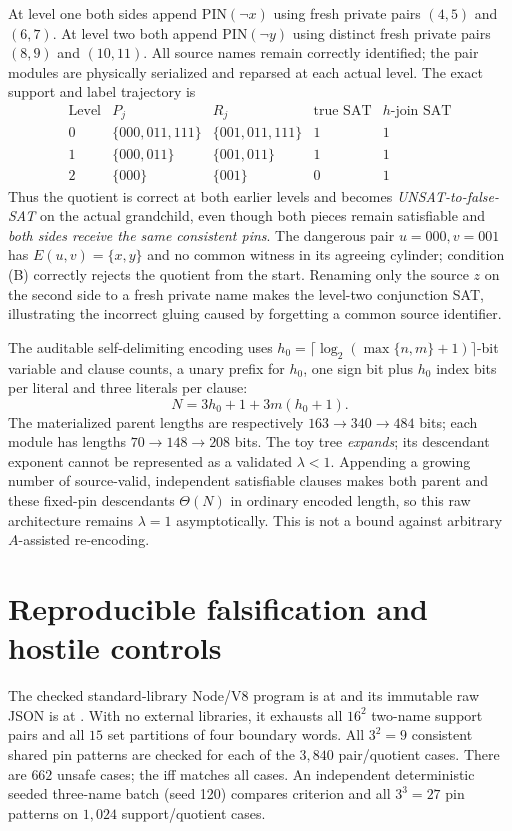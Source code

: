 \documentclass[11pt]{article}
\begin{document}
At level one both sides append $\mathrm{PIN}(\neg x)$ using
fresh private pairs $(4,5)$ and $(6,7)$.
At level two both append $\mathrm{PIN}(\neg y)$ using
distinct fresh private pairs $(8,9)$ and $(10,11)$.
All source names remain correctly identified; the pair modules
are physically serialized and reparsed at each actual level.
The exact support and label trajectory is
\[
\begin{array}{c|c|c|c|c}
 \text{Level}&P_j&R_j&\text{true SAT}&h\text{-join SAT}\\\hline
 0&\{000,011,111\}&\{001,011,111\}&1&1\\
 1&\{000,011\}&\{001,011\}&1&1\\
 2&\{000\}&\{001\}&0&1
\end{array}
\]
Thus the quotient is correct at both earlier levels and becomes
\emph{UNSAT-to-false-SAT} on the actual grandchild, even though
both pieces remain satisfiable and \emph{both sides receive the same
consistent pins}. The dangerous pair $u=000,v=001$ has
$E(u,v)=\{x,y\}$ and no common witness in its agreeing cylinder;
condition (B) correctly rejects the quotient from the start.
Renaming only the source $z$ on the second side to a fresh private
name makes the level-two conjunction SAT, illustrating the
incorrect gluing caused by forgetting a common source identifier.

The auditable self-delimiting encoding uses
$h_0=\lceil\log_2(\max\{n,m\}+1)\rceil$-bit variable and clause
counts, a unary prefix for $h_0$, one sign bit plus $h_0$ index
bits per literal and three literals per clause:
\[
 N=3h_0+1+3m(h_0+1).
\]
The materialized parent lengths are respectively
$163\to340\to484$ bits; each module has lengths
$70\to148\to208$ bits. The toy tree \emph{expands}; its
descendant exponent cannot be represented as a validated
$\lambda<1$. Appending a growing number of source-valid,
independent satisfiable clauses makes both parent and these
fixed-pin descendants $\Theta(N)$ in ordinary encoded length,
so this raw architecture remains $\lambda=1$ asymptotically.
This is not a bound against arbitrary $A$-assisted re-encoding.

\section{Reproducible falsification and hostile controls}
The checked standard-library Node/V8 program is at
and its immutable raw JSON is at
.
With no external libraries, it exhausts all $16^2$ two-name
support pairs and all $15$ set partitions of four boundary words.
All $3^2=9$ consistent shared pin patterns are checked for
each of the $3{,}840$ pair/quotient cases.
There are $662$ unsafe cases; the iff matches all cases.
An independent deterministic seeded three-name batch
(seed 120) compares criterion and all $3^3=27$ pin
patterns on $1{,}024$ support/quotient cases.
\end{document}
